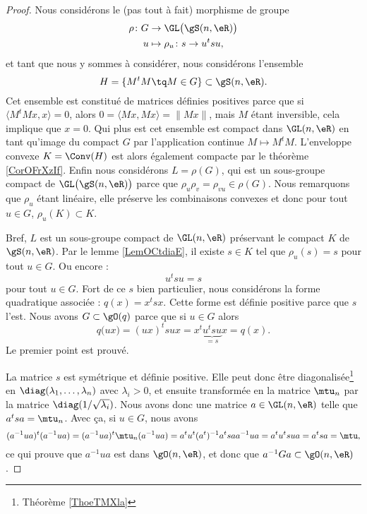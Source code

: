 \begin{proof}
    Nous considérons le (pas tout à fait) morphisme de groupe
    \begin{equation}
        \begin{aligned}
            \rho\colon G&\to \GL\big( \gS(n,\eR) \big) \\
            u&\mapsto \rho_u\colon s\to  u^tsu,
        \end{aligned}
    \end{equation}
    et tant que nous y sommes à considérer, nous considérons l'ensemble
    \begin{equation}
        H=\{ M^tM\tq M\in G \}\subset \gS(n,\eR).
    \end{equation}
    Cet ensemble est constitué de matrices définies positives parce que si \( \langle M^tMx, x\rangle =0\), alors \(0= \langle Mx, Mx\rangle =\| Mx \|\), mais \( M\) étant inversible, cela implique que \( x=0\). Qui plus est cet ensemble est compact dans \( \GL(n,\eR)\) en tant qu'image du compact \( G\) par l'application continue \( M\mapsto M^tM\). L'enveloppe convexe \( K=\Conv(H)\) est alors également compacte par le théorème \ref{CorOFrXzIf}. Enfin nous considérons \( L=\rho(G)\), qui est un sous-groupe compact de \( \GL\big( \gS(n,\eR) \big)\) parce que \( \rho_u\rho_v=\rho_{vu}\in\rho(G)\). Nous remarquons que \( \rho_u\) étant linéaire, elle préserve les combinaisons convexes et donc pour tout \( u\in G\), \( \rho_u(K)\subset K\).

    Bref, \( L\) est un sous-groupe compact de \( \GL(n,\eR)\) préservant le compact \( K\) de \( \gS(n,\eR)\). Par le lemme \ref{LemOCtdiaE}, il existe \( s\in K\) tel que \( \rho_u(s)=s\) pour tout \( u\in G\). Ou encore :
    \begin{equation}
        u^tsu=s
    \end{equation}
    pour tout \( u\in G\). Fort de ce \( s\) bien particulier, nous considérons la forme quadratique associée : \( q(x)=x^tsx\). Cette forme est définie positive parce que \( s\) l'est. Nous avons \( G\subset \gO(q)\) parce que si \( u\in G\) alors
    \begin{equation}
        q\big( ux \big)=(ux)^tsux=x^t\underbrace{u^tsu}_{=s}x=q(x).
    \end{equation}
    Le premier point est prouvé.

    La matrice \( s\) est symétrique et définie positive. Elle peut donc être diagonalisée\footnote{Théorème \ref{ThoeTMXla}} en \( \diag(\lambda_1,\ldots, \lambda_n)\) avec \( \lambda_i>0\), et ensuite transformée en la matrice \( \mtu_n\) par la matrice \( \diag(1/\sqrt{\lambda_i})\). Nous avons donc une matrice \( a\in\GL(n,\eR)\) telle que \( a^tsa=\mtu_n\). Avec ça, si \( u\in G\), nous avons
    \begin{equation}
        (a^{-1}ua)^t(a^{-1} ua)=(a^{-1}ua)^t\mtu_n(a^{-1} ua)=a^tu^t(a^t)^{-1}a^tsaa^{-1}ua=a^tu^tsua=a^tsa=\mtu,
    \end{equation}
    ce qui prouve que \( a^{-1} ua\) est dans \( \gO(n,\eR)\), et donc que \( a^{-1} G a\subset \gO(n,\eR)\).
\end{proof}

